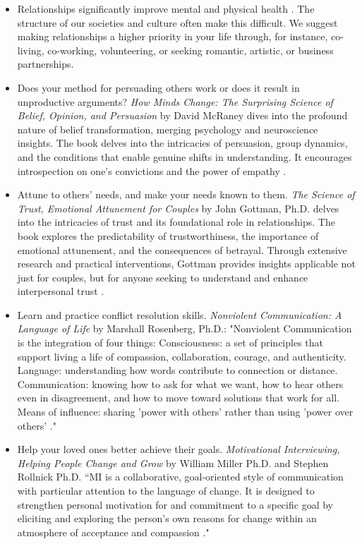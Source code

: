 \documentclass[12pt,letterpaper]{article}
\begin{document}
\begin{itemize}
    \item Relationships significantly improve mental and physical health \cite{holt-lunstadRelationships}. The structure of our societies and culture often make this difficult. We suggest making relationships a higher priority in your life through, for instance, co-living, co-working, volunteering, or seeking romantic, artistic, or business partnerships.  
    \item Does your method for persuading others work or does it result in unproductive arguments? \textit{How Minds Change: The Surprising Science of Belief, Opinion, and Persuasion} by David McRaney dives into the profound nature of belief transformation, merging psychology and neuroscience insights. The book delves into the intricacies of persuasion, group dynamics, and the conditions that enable genuine shifts in understanding. It encourages introspection on one's convictions and the power of empathy \cite{mcraneyMinds}.
    \item Attune to others' needs, and make your needs known to them. \textit{The Science of Trust, Emotional Attunement for Couples} by John Gottman, Ph.D. delves into the intricacies of trust and its foundational role in relationships. The book explores the predictability of trustworthiness, the importance of emotional attunement, and the consequences of betrayal. Through extensive research and practical interventions, Gottman provides insights applicable not just for couples, but for anyone seeking to understand and enhance interpersonal trust \cite{gottmanTrust}.
    \item Learn and practice conflict resolution skills. \textit{Nonviolent Communication: A Language of Life} by Marshall Rosenberg, Ph.D.: "Nonviolent Communication is the integration of four things: Consciousness: a set of principles that support living a life of compassion, collaboration, courage, and authenticity. Language: understanding how words contribute to connection or distance. Communication: knowing how to ask for what we want, how to hear others even in disagreement, and how to move toward solutions that work for all. Means of influence: sharing 'power with others' rather than using 'power over others' \cite{rosenbergNVC}."
    \item Help your loved ones better achieve their goals. \textit{Motivational Interviewing, Helping People Change and Grow} by William Miller Ph.D. and Stephen Rollnick Ph.D. “MI is a collaborative, goal-oriented style of communication with particular attention to the language of change. It is designed to strengthen personal motivation for and commitment to a specific goal by eliciting and exploring the person's own reasons for change within an atmosphere of acceptance and compassion \cite{millerMotivationalInterviewing}."

\end{itemize}
\end{document}
